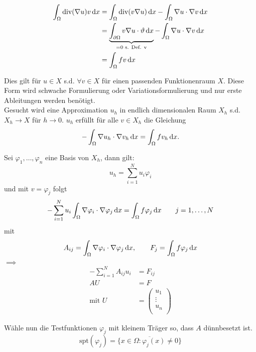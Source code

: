 \begin{align*}
	\int_\Omega \text{div}( \nabla u) v \mathop{}\!\mathrm{d} x
	&= \int_\Omega \text{div}( v \nabla u ) \mathop{}\!\mathrm{d} x -	\int_\Omega \nabla u \cdot \nabla v \mathop{}\!\mathrm{d} x \\
	&=  \underbrace{\int_{\partial\Omega}  v \nabla u  \cdot \vartheta \mathop{}\!\mathrm{d} x}_{=0\text{ s. Def. v}} -	\int_\Omega \nabla u \cdot \nabla v \mathop{}\!\mathrm{d} x \\
	&=  \int_\Omega fv \mathop{}\!\mathrm{d} x
\end{align*}

Dies gilt für $u \in X$ s.d. $\forall v\in X$ f\"ur einen passenden Funktionenraum $X$.
Diese Form wird schwache Formulierung oder Variationsformulierung und nur erste Ableitungen werden benötigt.
\\
Gesucht wird eine Approximation $u_h$ in endlich dimensionalen Raum $X_h$ s.d. $X_h \to X$ f\"ur $h \to 0$.\enter
$u_h$ erf\"ullt f\"ur alle $v\in X_h$ die Gleichung
\begin{equation*}
	-	\int_\Omega \nabla u_h \cdot \nabla v_h \mathop{}\!\mathrm{d} x = \int_\Omega fv_h \mathop{}\!\mathrm{d} x.
\end{equation*}

Sei $\varphi_1,\dots, \varphi_n$ eine Basis von $X_h$, dann gilt:
\begin{equation*}
	u_h = \displaystyle\sum_{i=1}^N u_i\varphi_i 
\end{equation*}
und mit $v=\varphi_j$ folgt 
\begin{equation*}
	- \displaystyle\sum_{i=1}^N u_i \int_\Omega \nabla \varphi_i \cdot \nabla \varphi_j \mathop{}\!\mathrm{d} x = \int_\Omega f\varphi_j \mathop{}\!\mathrm{d} x \qquad j=1,\dots,N
\end{equation*}
mit 
\begin{align*}
	A_{ij} = \int_\Omega \nabla \varphi_i \cdot \nabla \varphi_j \mathop{}\!\mathrm{d} x, \quad \quad F_j = \int_\Omega f \varphi_j \mathop{}\!\mathrm{d} x
\end{align*}
$\implies$
\begin{align*}
	- \displaystyle\sum_{i=1}^N A_{ij}u_i &= F_{ij}\\
	AU &=F\\
	\text{mit } U &=
	\begin{pmatrix}
	u_1      \\
	\vdots	 \\
	u_n	  	 \\
	\end{pmatrix}
\end{align*} 

W\"ahle nun die Testfunktionen $\varphi_j$ mit kleinem Tr\"ager so, dass $A$ dünnbesetzt ist.\enter
\begin{equation*}
	\text{spt}(\varphi_j) = \overline{\Big\{  x \in \Omega: \varphi_j(x) \neq 0 \Big\}}
\end{equation*}

